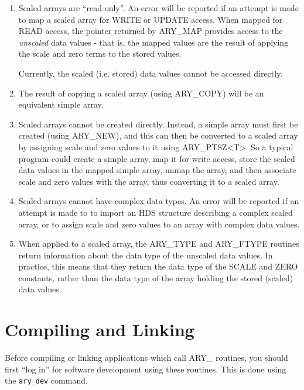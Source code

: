 \documentclass[twoside,11pt]{article}
\newcommand{\xlabel}[1]{}
\begin{document}
\begin{enumerate}

\item Scaled arrays are ``read-only''. An error will be reported if an
attempt is made to map a scaled array for WRITE or UPDATE access. When
mapped for READ access, the pointer returned by ARY\_MAP provides access
to the \emph{unscaled} data values - that is, the mapped values are the
result of applying the scale and zero terms to the stored values.

Currently, the scaled (i.e. stored) data values cannot be accessed
directly.

\item The result of copying a scaled array (using ARY\_COPY) will be an
equivalent simple array.

\item Scaled arrays cannot be created directly. Instead, a simple array must
first be created (using ARY\_NEW), and this can then be converted to a scaled
array by assigning scale and zero values to it using ARY\_PTSZ<T>. So a
typical program could create a simple array, map it for write access,
store the scaled data values in the mapped simple array, unmap the
array, and then associate scale and zero values with the array, thus
converting it to a scaled array.

\item Scaled arrays cannot have complex data types. An error will be
reported if an attempt is made to to import an HDS structure describing a
complex scaled array, or to assign scale and zero values to an array with
complex data values.

\item When applied to a scaled array, the ARY\_TYPE and ARY\_FTYPE routines 
return information about the data type of the unscaled data values. In
practice, this means that they return the data type of the SCALE and ZERO
constants, rather than the data type of the array holding the stored
(scaled) data values.

\end{enumerate}


\section{\xlabel{compiling_and_linking}Compiling and Linking}
\label{compiling_and_linking}

Before compiling or linking applications which call ARY\_ routines, you
should first ``log in'' for software development using these routines. 
This is done using the \texttt{ary\_dev} command.
\end{document}
